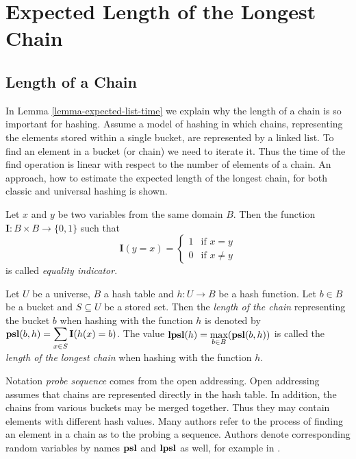 \chapter{Expected Length of the Longest Chain}
\label{chapter-elpsl}

\section{Length of a Chain}
In Lemma \ref{lemma-expected-list-time} we explain why the length of a chain is so important for hashing. Assume a model of hashing in which chains, representing the elements stored within a single bucket, are represented by a linked list. To find an element in a bucket (or chain) we need to iterate it. Thus the time of the find operation is linear with respect to the number of elements of a chain. An approach, how to estimate the expected length of the longest chain, for both classic and universal hashing is shown.

\begin{definition}
Let $x$ and $y$ be two variables from the same domain $B$. Then the function $\mathbf{I}: B \times B \rightarrow \{0, 1\}$ such that
\[
 \mathbf{I}(y = x) =
  \begin{cases}
   1 & \text{if } x = y \\
   0 & \text{if } x \neq y
  \end{cases}
\]
is called \emph{equality indicator}.
\end{definition}

\begin{definition}
Let $U$ be a universe, $B$ a hash table and $h: U \rightarrow B$ be a hash function. Let $b \in B$ be a bucket and $S \subseteq U$ be a stored set. Then the \emph{length of the chain} representing the bucket $b$ when hashing with the function $h$ is denoted by $\mathbf{psl}(b, h) = \displaystyle \sum_{x \in S} \mathbf{I}(h(x) = b)$. The value $\mathbf{lpsl}(h) = \displaystyle \max_{b \in B} (\mathbf{psl}(b, h))$ is called the \emph{length of the longest chain} when hashing with the function $h$.
\end{definition}

Notation \emph{probe sequence} comes from the open addressing. Open addressing assumes that chains are represented directly in the hash table. In addition, the chains from various buckets may be merged together. Thus they may contain elements with different hash values. Many authors refer to the process of finding an element in a chain as to the probing a sequence. Authors denote corresponding random variables by names $\mathbf{psl}$ and $\mathbf{lpsl}$ as well, for example in \cite{10.1109/SFCS.1985.48}.

